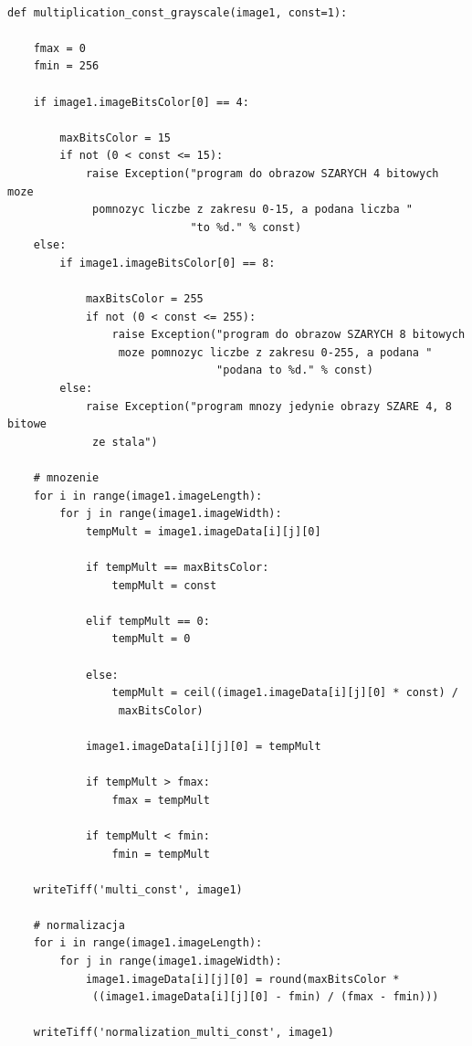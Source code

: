 \documentclass[magisterska,openany]{pracadypl}
\begin{document}
\lstset{language=Python}
\vspace{0.25cm}
\begin{lstlisting}[caption={Mnożenie obrazu przez zadaną liczbę}]

def multiplication_const_grayscale(image1, const=1):

    fmax = 0
    fmin = 256

    if image1.imageBitsColor[0] == 4:

        maxBitsColor = 15
        if not (0 < const <= 15):
            raise Exception("program do obrazow SZARYCH 4 bitowych moze
             pomnozyc liczbe z zakresu 0-15, a podana liczba "
                            "to %d." % const)
    else:
        if image1.imageBitsColor[0] == 8:

            maxBitsColor = 255
            if not (0 < const <= 255):
                raise Exception("program do obrazow SZARYCH 8 bitowych
                 moze pomnozyc liczbe z zakresu 0-255, a podana "
                                "podana to %d." % const)
        else:
            raise Exception("program mnozy jedynie obrazy SZARE 4, 8 bitowe
             ze stala")

    # mnozenie
    for i in range(image1.imageLength):
        for j in range(image1.imageWidth):
            tempMult = image1.imageData[i][j][0]

            if tempMult == maxBitsColor:
                tempMult = const

            elif tempMult == 0:
                tempMult = 0

            else:
                tempMult = ceil((image1.imageData[i][j][0] * const) /
                 maxBitsColor)

            image1.imageData[i][j][0] = tempMult

            if tempMult > fmax:
                fmax = tempMult

            if tempMult < fmin:
                fmin = tempMult

    writeTiff('multi_const', image1)

    # normalizacja
    for i in range(image1.imageLength):
        for j in range(image1.imageWidth):
            image1.imageData[i][j][0] = round(maxBitsColor *
             ((image1.imageData[i][j][0] - fmin) / (fmax - fmin)))

    writeTiff('normalization_multi_const', image1)

\end{lstlisting}
\newpage
\end{document}
